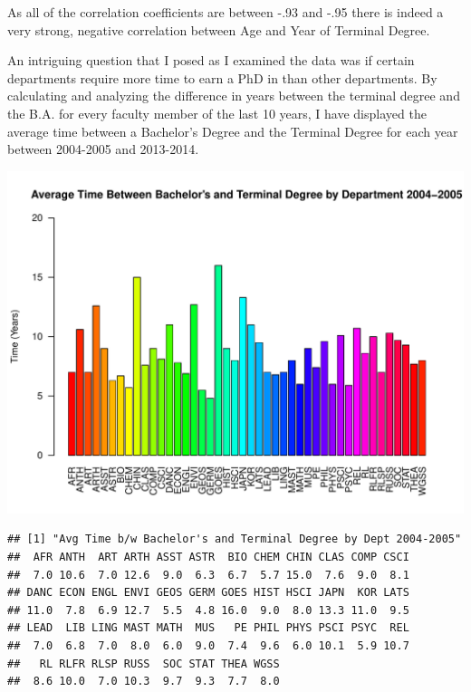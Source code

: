 \documentclass[12pt,a4paper]{article}\usepackage[]{graphicx}\usepackage[]{color}
\makeatletter
\def\maxwidth{ %
  \ifdim\Gin@nat@width>\linewidth
    \linewidth
  \else
    \Gin@nat@width
  \fi
}
\newenvironment{kframe}{%
 \def\at@end@of@kframe{}%
 \ifinner\ifhmode%
  \def\at@end@of@kframe{\end{minipage}}%
  \begin{minipage}{\columnwidth}%
 \fi\fi%
 \def\FrameCommand##1{\hskip\@totalleftmargin \hskip-\fboxsep
 \colorbox{shadecolor}{##1}\hskip-\fboxsep
     \hskip-\linewidth \hskip-\@totalleftmargin \hskip\columnwidth}%
 \MakeFramed {\advance\hsize-\width
   \@totalleftmargin\z@ \linewidth\hsize
   \@setminipage}}%
 {\par\unskip\endMakeFramed%
 \at@end@of@kframe}
\newenvironment{knitrout}{}{} %
\theoremstyle{definition}
\makeatother
\begin{document}
\bigskip
As all of the correlation coefficients are between -.93 and -.95 there is indeed a very strong, negative correlation between Age and Year of Terminal Degree.

\bigskip
An intriguing question that I posed as I examined the data was if certain departments require more time to earn a PhD in than other departments. By calculating and analyzing the difference in years between the terminal degree and the B.A. for every faculty member of the last 10 years, I have displayed the average time between a Bachelor's Degree and the Terminal Degree for each year between 2004-2005 and 2013-2014.

\begin{knitrout}
\color{fgcolor}
\includegraphics[width=\maxwidth]{figure/unnamed-chunk-12-1} 
\begin{kframe}\begin{verbatim}
## [1] "Avg Time b/w Bachelor's and Terminal Degree by Dept 2004-2005"
##  AFR ANTH  ART ARTH ASST ASTR  BIO CHEM CHIN CLAS COMP CSCI 
##  7.0 10.6  7.0 12.6  9.0  6.3  6.7  5.7 15.0  7.6  9.0  8.1 
## DANC ECON ENGL ENVI GEOS GERM GOES HIST HSCI JAPN  KOR LATS 
## 11.0  7.8  6.9 12.7  5.5  4.8 16.0  9.0  8.0 13.3 11.0  9.5 
## LEAD  LIB LING MAST MATH  MUS   PE PHIL PHYS PSCI PSYC  REL 
##  7.0  6.8  7.0  8.0  6.0  9.0  7.4  9.6  6.0 10.1  5.9 10.7 
##   RL RLFR RLSP RUSS  SOC STAT THEA WGSS 
##  8.6 10.0  7.0 10.3  9.7  9.3  7.7  8.0
\end{verbatim}
\end{kframe}

\end{knitrout}
\end{document}
